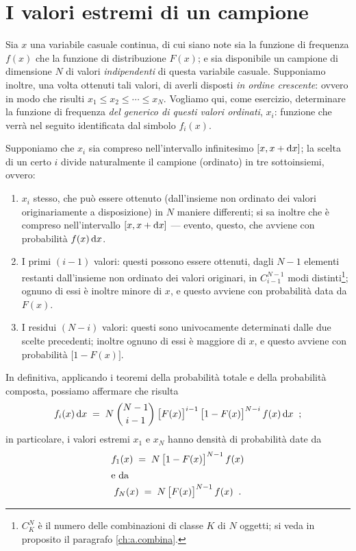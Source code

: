 \section{I valori estremi di un campione}%
%
\label{ch:6.estremi}
Sia $x$ una variabile casuale continua, di cui siano note
sia la funzione di frequenza $f(x)$ che la funzione di
distribuzione $F(x)$; e sia disponibile un campione di
dimensione $N$ di valori \emph{indipendenti} di questa
variabile casuale.  Supponiamo inoltre, una volta ottenuti
tali valori, di averli disposti \emph{in ordine crescente}:
ovvero in modo che risulti $x_1 \le x_2 \le \cdots \le x_N$.
Vogliamo qui, come esercizio, determinare la funzione di
frequenza \emph{del generico di questi valori ordinati},
$x_i$: funzione che verr\`a nel seguito identificata dal
simbolo $f_i(x)$.

Supponiamo che $x_i$ sia compreso nell'intervallo
infinitesimo $ [ x, x+\mathrm{d} x ] $; la scelta di un certo $i$
divide naturalmente il campione (ordinato) in tre
sottoinsiemi, ovvero:
\begin{enumerate}
\item $x_i$ stesso, che pu\`o essere ottenuto (dall'insieme
  non ordinato dei valori originariamente a disposizione) in
  $N$ maniere differenti; si sa inoltre che \`e compreso
  nell'intervallo $[x, x+\mathrm{d} x]$ --- evento, questo, che
  avviene con probabilit\`a $f(x) \, \mathrm{d} x$.
\item I primi $(i-1)$ valori: questi possono essere
  ottenuti, dagli $N-1$ elementi restanti dall'insieme non
  ordinato dei valori originari, in $C^{N-1}_{i-1}$ modi
  distinti\/\footnote{$C^N_K$ \`e il numero delle
    combinazioni di classe $K$ di $N$ oggetti; si veda in
    proposito il paragrafo \ref{ch:a.combina}.}; ognuno di
  essi \`e inoltre minore di $x$, e questo avviene con
  probabilit\`a data da $F(x)$.
\item I residui $(N-i)$ valori: questi sono univocamente
  determinati dalle due scelte precedenti; inoltre ognuno di
  essi \`e maggiore di $x$, e questo avviene con
  probabilit\`a $\bigl[ 1 - F(x) \bigr]$.
\end{enumerate}
In definitiva, applicando i teoremi della probabilit\`a
totale e della probabilit\`a composta, possiamo affermare
che risulta
\begin{equation} \label{eq:6.iesimo}
  f_i(x) \, \mathrm{d} x \; = \; N \: \binom{N-1}{i-1} \: \bigl[
  F(x) \bigr]^{i - 1} \, \bigl[ 1 - F(x) \bigr]^{N - i} \,
  f(x) \,  \mathrm{d} x \;\; ;
\end{equation}
in particolare, i valori estremi $x_1$ e $x_N$ hanno
densit\`a di probabilit\`a date da
\begin{gather*}
  f_1(x) \; =  \;N \, \bigl[ 1 - F(x) \bigr]^{N - 1} \, f(x)
  \\
  \intertext{e da}
  f_N(x) \; = \; N \, \bigl[ F(x) \bigr]^{N - 1} \, f(x)
  \;\; .
\end{gather*}%

\endinput
